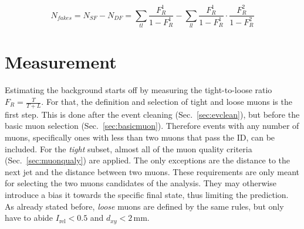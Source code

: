 \begin{equation}
  \label{eq:fakes}
  N_{fakes} = N_{SF} - N_{DF} =  \sum_{tl} \frac{F_R^1}{1 - F_R^1} - \sum_{ll} \frac{F_R^1}{1 - F_R^1} \cdot \frac{F_R^2}{1 - F_R^2}
\end{equation}


\section{Measurement}
\label{sec:tlmeasurement}

Estimating the background starts off by measuring the tight-to-loose ratio $F_R = \frac{T}{T+L}$. For that, the definition and selection of tight and loose muons is the first step. This is done after the event cleaning (Sec.~\ref{sec:evclean}), but before the basic muon selection (Sec.~\ref{sec:basicmuon}). Therefore events with any number of muons, specifically ones with less than two muons that pass the ID, can be included. For the \textit{tight} subset, almost all of the muon quality criteria (Sec.~\ref{sec:muonqualy}) are applied. The only exceptions are the distance to the next jet and the distance between two muons. These requirements are only meant for selecting the two muons candidates of the analysis. They may otherwise introduce a bias it towards the specific final state, thus limiting the prediction. As already stated before, \textit{loose} muons are defined by the same rules, but only have to abide $I_{\text{rel}} < 0.5$ and $d_{xy} < 2\,\text{mm}$.

